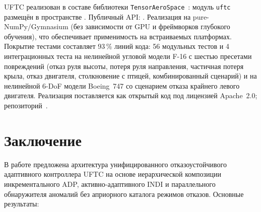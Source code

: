 \documentclass[a4paper,14pt]{extarticle}
\newcommand{\UFTC}{\textsc{UFTC}}
\begin{document}
\UFTC{} реализован в составе библиотеки \texttt{TensorAeroSpace}~\cite{tensoraerospace}: модуль \texttt{uftc} размещён в пространстве . Публичный API: . Реализация на pure-NumPy/Gymnasium (без зависимости от GPU и фреймворков глубокого обучения), что обеспечивает применимость на встраиваемых платформах. Покрытие тестами составляет 93\,\% линий кода: 56 модульных тестов и 4 интеграционных теста на нелинейной угловой модели F-16 с шестью пресетами повреждений (отказ руля высоты, потеря руля направления, частичная потеря крыла, отказ двигателя, столкновение с птицей, комбинированный сценарий) и на нелинейной 6-DoF модели Boeing~747 со сценарием отказа крайнего левого двигателя. Реализация поставляется как открытый код под лицензией Apache~2.0; репозиторий~\cite{tensoraerospace}.

\section{Заключение}
\label{sec:concl}

В работе предложена архитектура унифицированного отказоустойчивого адаптивного контроллера \UFTC{} на основе иерархической композиции инкрементального ADP, активно-адаптивного INDI и параллельного обнаружителя аномалий без априорного каталога режимов отказов. Основные результаты:
\end{document}
